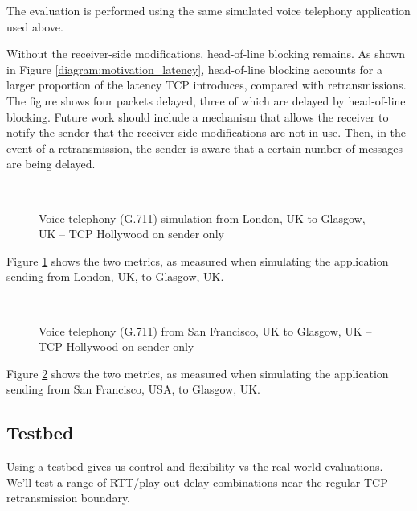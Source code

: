 The evaluation is performed using the same simulated voice telephony
application used above.

Without the receiver-side modifications, head-of-line blocking remains.
As shown in Figure \ref{diagram:motivation_latency}, head-of-line blocking
accounts for a larger proportion of the latency TCP introduces, compared
with retransmissions. The figure shows four packets delayed, three of which
are delayed by head-of-line blocking. Future work should include a
mechanism that allows the receiver to notify the sender that the receiver
side modifications are not in use. Then, in the event of a retransmission,
the sender is aware that a certain number of messages are being delayed.

\begin{figure}[t]
	\centering
  \\
	\caption{Voice telephony (G.711) simulation from London, UK to Glasgow, UK -- TCP Hollywood on sender only}
	\label{fig:voip:sender:lon}
\end{figure}

Figure \ref{fig:voip:sender:lon} shows the two metrics, as measured when
simulating the application sending from London, UK, to Glasgow, UK.

\begin{figure}[t]
	\centering
	\\
	\caption{Voice telephony (G.711) from San Francisco, UK to Glasgow, UK -- TCP Hollywood on sender only}
	\label{fig:voip:sender:sf}
\end{figure}

Figure \ref{fig:voip:sender:sf} shows the two metrics, as measured when
simulating the application sending from San Francisco, USA, to Glasgow, UK.

\subsection{Testbed}
\label{sec:perf:testbed}

Using a testbed gives us control and flexibility vs the real-world
evaluations. We'll test a range of RTT/play-out delay combinations near
the regular TCP retransmission boundary.
